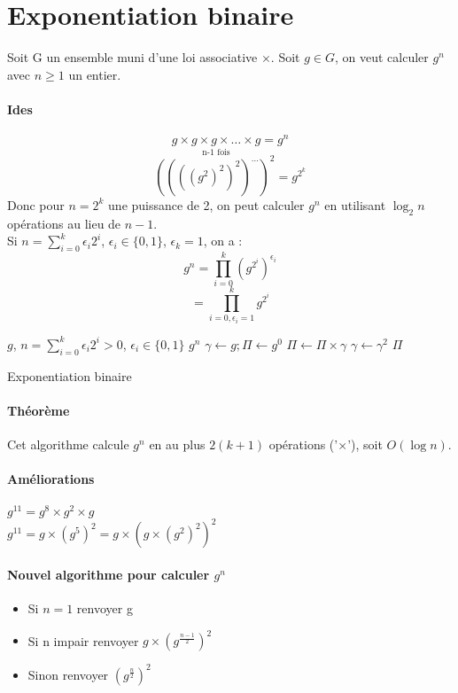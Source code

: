 \documentclass[12pt,a4paper]{report}
\begin{document}
\section{Exponentiation binaire}
Soit G un ensemble muni d'une loi associative $\times$. Soit $g\in G$, on veut calculer $g^n$ avec $n\geqslant 1$ un entier.
\paragraph{Ides\\}
$$\underset{\mbox{n-1 fois}}{g\times g \times g \times \ldots \times g}=g^n$$
$$ \left(\left(\left(\left(g^2\right)^2\right)^2\right)^{\ldots}\right)^2 = g^{2^k}$$
Donc pour $n=2^k$ une puissance de 2, on peut calculer $g^n$ en utilisant $\log_2 n$ opérations au lieu de $n-1$. \\
Si $\displaystyle n=\sum_{i=0}^k \epsilon_i 2^i$, $\epsilon_i \in \{0,1\}$, $\epsilon_k=1$, on a :
$$ g^n = \prod_{i=0}^{k} \left(g^{2^i}\right)^{\epsilon_i} $$
$$ =  \prod_{i=0,\epsilon_i=1}^{k} g^{2^i} $$
\begin{algorithm}[h!]
\begin{algorithmic}[1]
\REQUIRE $g$, $\displaystyle n=\sum_{i=0}^{k}\epsilon_i 2^i >0$, $\epsilon_i \in \{0,1\}$
\ENSURE $g^n$
\STATE $\gamma \leftarrow g; \Pi \leftarrow g^0$
\STATE $ \Pi \leftarrow \Pi \times \gamma$
\ENDIF
\STATE $\gamma \leftarrow \gamma^2$
\ENDFOR
\RETURN $\Pi$
\end{algorithmic}
\caption{Exponentiation binaire}
\end{algorithm}
\paragraph{Théorème\\}
Cet algorithme calcule $g^n$ en au plus $2(k+1)$ opérations ('$\times$'), soit $O(\log n)$.
\paragraph{Améliorations\\}
$g^{11}=g^8\times g^2 \times g$ \\
$g^{11}=g\times \left(g^5\right)^2 = g \times \left( g \times \left(g^2\right) ^2 \right) ^2 $
\paragraph{Nouvel algorithme pour calculer $g^n$\\}
\begin{itemize}
\item Si $ n=1$ renvoyer g
\item Si n impair renvoyer $g\times \left( g^{\frac{n-1}{2}} \right)^2$
\item Sinon renvoyer $\left( g^{\frac{n}{2}} \right)^2$
\end{itemize}
\end{document}
